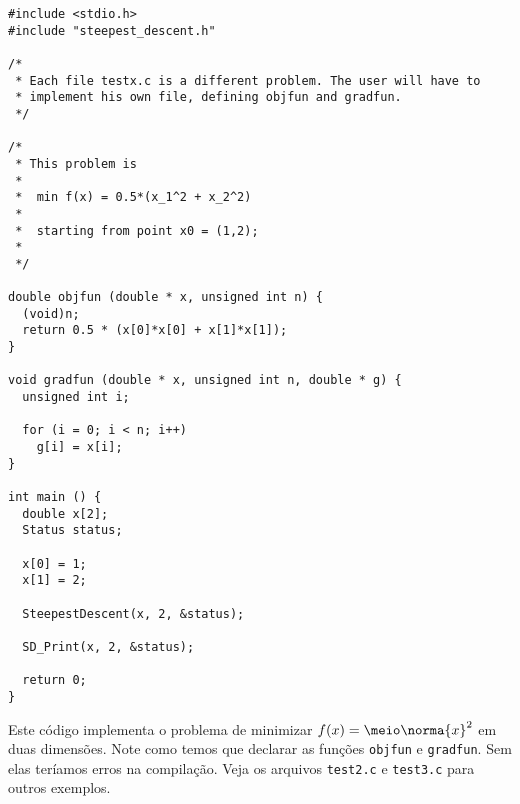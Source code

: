 \documentclass[letterpaper,11pt]{article}
\numberwithin{equation}{section}
\begin{document}
\begin{verbatim}
#include <stdio.h>
#include "steepest_descent.h"

/*
 * Each file testx.c is a different problem. The user will have to
 * implement his own file, defining objfun and gradfun.
 */

/*
 * This problem is
 *
 *  min f(x) = 0.5*(x_1^2 + x_2^2)
 *
 *  starting from point x0 = (1,2);
 *
 */

double objfun (double * x, unsigned int n) {
  (void)n;
  return 0.5 * (x[0]*x[0] + x[1]*x[1]);
}

void gradfun (double * x, unsigned int n, double * g) {
  unsigned int i;

  for (i = 0; i < n; i++)
    g[i] = x[i];
}

int main () {
  double x[2];
  Status status;

  x[0] = 1;
  x[1] = 2;

  SteepestDescent(x, 2, &status);

  SD_Print(x, 2, &status);

  return 0;
}
\end{verbatim}
Este código implementa o problema de minimizar $f(x) = \meio\norma{x}^2$ em duas dimensões.
Note como temos que declarar as funções \verb+objfun+ e \verb+gradfun+. Sem elas teríamos
erros na compilação. Veja os arquivos \verb+test2.c+ e \verb+test3.c+
para outros exemplos.
\end{document}
